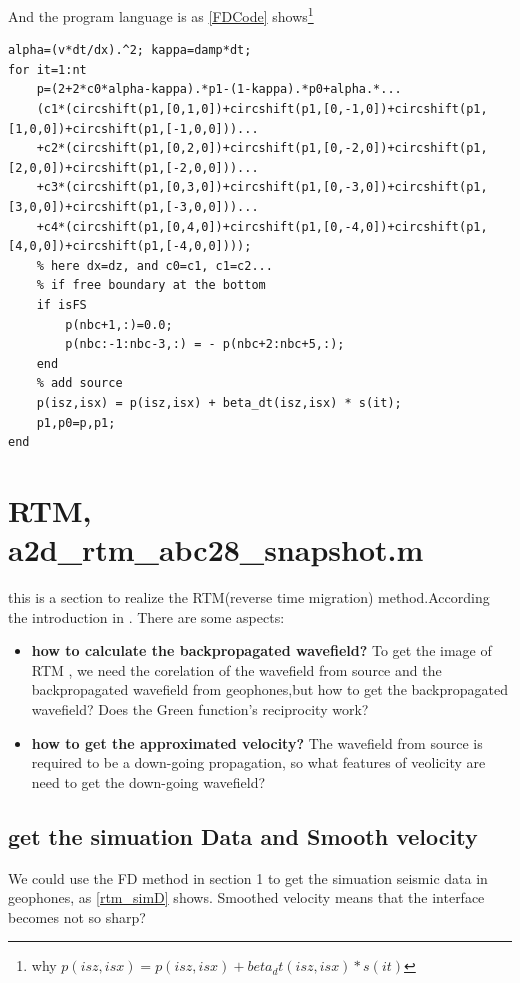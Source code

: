 \documentclass[a4paper]{article}
\begin{document}
		And the program language is as \autoref{FDCode} shows\footnote{why $p(isz,isx) = p(isz,isx) + beta_dt(isz,isx) * s(it)$}
		\begin{lstlisting}[caption=set ABC to the velocity variable (2 is same), label=FDCode,basicstyle=\tiny, numberstyle=\tiny]
% 
alpha=(v*dt/dx).^2; kappa=damp*dt;
for it=1:nt
	p=(2+2*c0*alpha-kappa).*p1-(1-kappa).*p0+alpha.*...
	(c1*(circshift(p1,[0,1,0])+circshift(p1,[0,-1,0])+circshift(p1,[1,0,0])+circshift(p1,[-1,0,0]))...
	+c2*(circshift(p1,[0,2,0])+circshift(p1,[0,-2,0])+circshift(p1,[2,0,0])+circshift(p1,[-2,0,0]))...
	+c3*(circshift(p1,[0,3,0])+circshift(p1,[0,-3,0])+circshift(p1,[3,0,0])+circshift(p1,[-3,0,0]))...
	+c4*(circshift(p1,[0,4,0])+circshift(p1,[0,-4,0])+circshift(p1,[4,0,0])+circshift(p1,[-4,0,0]))); 
	% here dx=dz, and c0=c1, c1=c2...
	% if free boundary at the bottom
	if isFS
		p(nbc+1,:)=0.0;
		p(nbc:-1:nbc-3,:) = - p(nbc+2:nbc+5,:);
	end
	% add source
	p(isz,isx) = p(isz,isx) + beta_dt(isz,isx) * s(it);
	p1,p0=p,p1;
end
    	\end{lstlisting}


\section{RTM, a2d\_rtm\_abc28\_snapshot.m}	
	this is a section to realize the RTM(reverse time migration) method.According the introduction in \cite[Schuster 2015]{SI}. There are some aspects:

	\begin{itemize}
		\item[1] \textbf{how to calculate the backpropagated wavefield?} To get the image of RTM , we need the corelation of the wavefield from source and the backpropagated wavefield from geophones,but how to get the backpropagated wavefield? Does the Green function's reciprocity work?
		\item[2] \textbf{how to get the approximated velocity?} The wavefield from source is required to be a down-going propagation, so what features of veolicity are need to get the down-going wavefield?
	\end{itemize}

	\subsection{get the simuation Data and Smooth velocity}

	We could use the FD method in section 1 to get the simuation seismic data in geophones, as \autoref{rtm_simD} shows. Smoothed velocity means that the interface becomes not so sharp?
\end{document}
